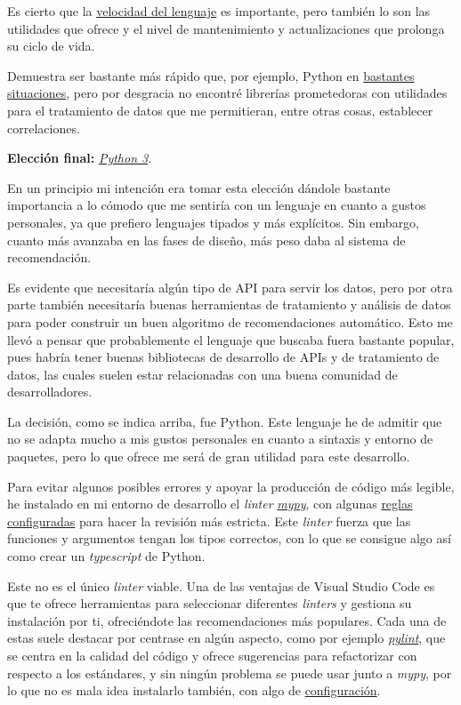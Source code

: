 Es cierto que la \href{https://benchmarksgame-team.pages.debian.net/benchmarksgame/index.html}{velocidad del lenguaje} es importante, pero también lo son las utilidades que ofrece y el nivel de mantenimiento y actualizaciones que prolonga su ciclo de vida.

Demuestra ser bastante más rápido que, por ejemplo, Python en \href{https://benchmarksgame-team.pages.debian.net/benchmarksgame/fastest/go-python3.html}{bastantes situaciones}, pero por desgracia no encontré librerías prometedoras con utilidades para el tratamiento de datos que me permitieran, entre otras cosas, establecer correlaciones.

\textbf{Elección final:} \href{https://www.python.org/}{\textit{Python 3}}.

En un principio mi intención era tomar esta elección dándole bastante importancia a lo cómodo que me sentiría con un lenguaje en cuanto a gustos personales, ya que prefiero lenguajes tipados y más explícitos. Sin embargo, cuanto más avanzaba en las fases de diseño, más peso daba al sistema de recomendación. 

Es evidente que necesitaría algún tipo de API para servir los datos, pero por otra parte también necesitaría buenas herramientas de tratamiento y análisis de datos para poder construir un buen algoritmo de recomendaciones automático. Esto me llevó a pensar que probablemente el lenguaje que buscaba fuera bastante popular, pues habría tener buenas bibliotecas de desarrollo de APIs y de tratamiento de datos, las cuales suelen estar relacionadas con una buena comunidad de desarrolladores.

La decisión, como se indica arriba, fue Python. Este lenguaje he de admitir que no se adapta mucho a mis gustos personales en cuanto a sintaxis y entorno de paquetes, pero lo que ofrece me será de gran utilidad para este desarrollo.

Para evitar algunos posibles errores y apoyar la producción de código más legible, he instalado en mi entorno de desarrollo el \textit{linter} \href{http://mypy-lang.org/}{\textit{mypy}}, con algunas \href{https://github.com/Anglepi/My-Many-Reads/blob/main/.mypy.ini}{reglas configuradas} para hacer la revisión más estricta. Este \textit{linter} fuerza que las funciones y argumentos tengan los tipos correctos, con lo que se consigue algo así como crear un \textit{typescript} de Python.

Este no es el único \textit{linter} viable. Una de las ventajas de Visual Studio Code es que te ofrece herramientas para seleccionar diferentes \textit{linters} y gestiona su instalación por ti, ofreciéndote las recomendaciones más populares. Cada una de estas suele destacar por centrase en algún aspecto, como por ejemplo \href{https://pypi.org/project/pylint/}{\textit{pylint}}, que se centra en la calidad del código y ofrece sugerencias para refactorizar con respecto a los estándares, y sin ningún problema se puede usar junto a \textit{mypy}, por lo que no es mala idea instalarlo también, con algo de \href{https://github.com/Anglepi/My-Many-Reads/blob/main/.pylintrc.ini}{configuración}.

